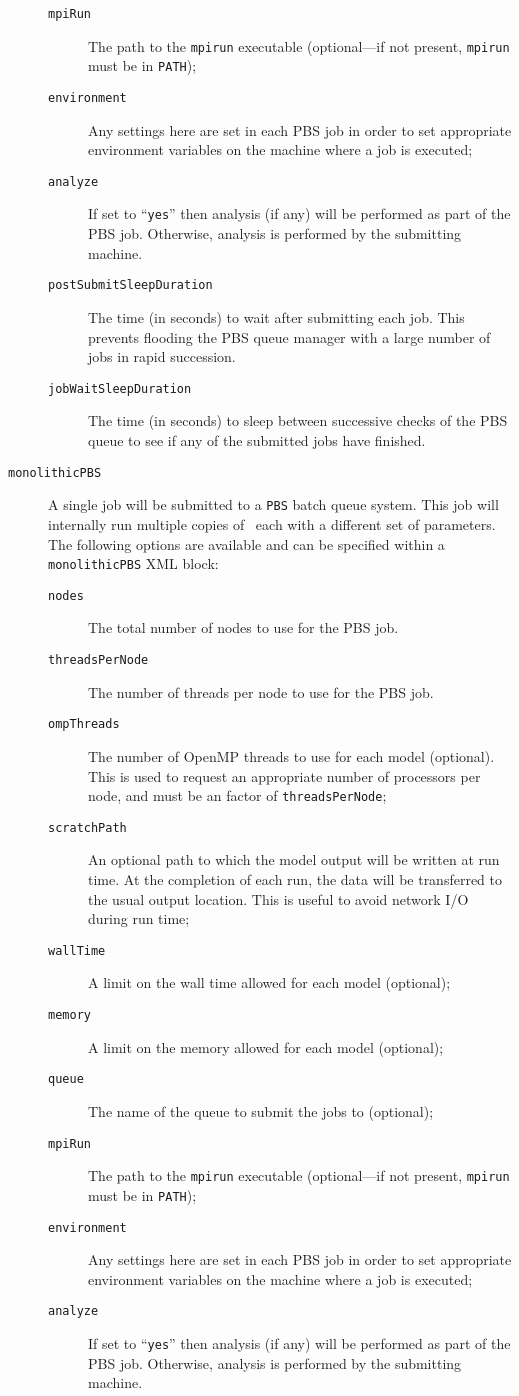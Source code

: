 \begin{description}
\begin{description}
\item[{\tt mpiRun}] The path to the {\tt mpirun} executable (optional---if not present, {\tt mpirun} must be in {\tt PATH});
\item[{\tt environment}] Any settings here are set in each {\sc PBS} job in order to set appropriate environment variables on the machine where a job is executed;
\item[{\tt analyze}] If set to ``{\tt yes}'' then analysis (if any) will be performed as part of the PBS job. Otherwise, analysis is performed by the submitting machine.
\item[{\tt postSubmitSleepDuration}] The time (in seconds) to wait after submitting each job. This prevents flooding the PBS queue manager with a large number of jobs in rapid succession.
\item[{\tt jobWaitSleepDuration}] The time (in seconds) to sleep between successive checks of the PBS queue to see if any of the submitted jobs have finished.
\end{description}

\item[{\tt monolithicPBS}] A single job will be submitted to a {\tt PBS} batch queue system. This job will internally run multiple copies of \glc\ each with a different set of parameters. The following options are available and can be specified within a {\tt monolithicPBS} XML block:
\begin{description}
\item[{\tt nodes}] The total number of nodes to use for the PBS job.
\item[{\tt threadsPerNode}] The number of threads per node to use for the PBS job.
\item[{\tt ompThreads}] The number of OpenMP threads to use for each model (optional). This is used to request an appropriate number of processors per node, and must be an factor of {\tt threadsPerNode};
\item[{\tt scratchPath}] An optional path to which the model output will be written at run time. At the completion of each run, the data will be transferred to the usual output location. This is useful to avoid network I/O during run time;
\item[{\tt wallTime}] A limit on the wall time allowed for each model (optional);
\item[{\tt memory}] A limit on the memory allowed for each model (optional);
\item[{\tt queue}] The name of the queue to submit the jobs to (optional);
\item[{\tt mpiRun}] The path to the {\tt mpirun} executable (optional---if not present, {\tt mpirun} must be in {\tt PATH});
\item[{\tt environment}] Any settings here are set in each {\sc PBS} job in order to set appropriate environment variables on the machine where a job is executed;
\item[{\tt analyze}] If set to ``{\tt yes}'' then analysis (if any) will be performed as part of the PBS job. Otherwise, analysis is performed by the submitting machine.
\end{description}


\end{description}
